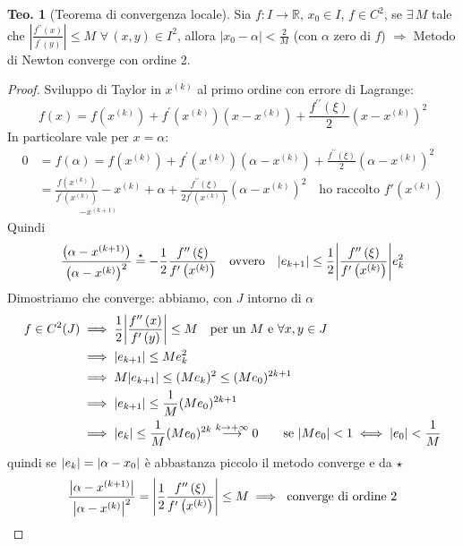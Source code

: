 \documentclass[a4paper,10pt]{article}
\theoremstyle{definition}
\theoremstyle{indentdefinition}
\theoremstyle{indenttheorem}
\newtheorem{thm}{Teo.}
\theoremstyle{myremark}
\theoremstyle{indentgeneral}
\theoremstyle{plain}
\theoremstyle{plain}
\newenvironment{myboxed} 
{\noindent\begin{lrbox}{\mybox}\begin{minipage}{\textwidth}}
{\end{minipage}\end{lrbox}\fbox{\usebox{\mybox}}}
\begin{document}
\begin{myboxed}
\begin{thm}[Teorema di convergenza locale]
Sia $f\colon I\rightarrow\mathbb{R}$, $x_{0}\in I$, $f\in C^{2}$,
se $\exists\,M$ tale che $\left|\frac{f^{\prime\prime}\left(x\right)}{f^{\prime}\left(y\right)}\right|\leq M$
$\forall\,\left(x,y\right)\in I^{2}$, allora $\left|x_{0}-\alpha\right|<\frac{2}{M}$
(con $\alpha$ zero di $f$) $\Longrightarrow$ Metodo di Newton converge
con ordine 2.
\end{thm}
\end{myboxed}

\begin{proof}
Sviluppo di Taylor in $x^{(k)}$ al primo ordine con errore di Lagrange:
$$f(x)=f(x^{(k)})+f^{\prime}(x^{(k)})(x-x^{\left(k\right)})+\frac{f^{\prime\prime}\left(\xi\right)}{2}\left(x-x^{\left(k\right)}\right)^{2}$$
In particolare vale per $x=\alpha$:
\begin{align*}
0&=f(\alpha)=f(x^{(k)})+f^{\prime}(x^{(k)})(\alpha-x^{\left(k\right)})+\frac{f^{\prime\prime}\left(\xi\right)}{2}\left(\alpha-x^{\left(k\right)}\right)^{2}  \\
&=\underset{-x^{\left(k+1\right)}}{\boxed{\frac{f\left(x^{\left(k\right)}\right)}{f^{\prime}\left(x^{\left(k\right)}\right)}-x^{\left(k\right)}}}+\alpha+\frac{f^{\prime\prime}\left(\xi\right)}{2f^{\prime}\left(x^{\left(k\right)}\right)}\left(\alpha-x^{\left(k\right)}\right)^{2} \quad \text{ho raccolto $f'(x^{(k)})$}
\end{align*}
Quindi
$$\frac{\left(\alpha-x^{\left(k+1\right)}\right)}{\left(\alpha-x^{\left(k\right)}\right)^{2}}\overset{\star}{=}-\frac{1}{2}\frac{f^{\prime\prime}\left(\xi\right)}{f^{\prime}\left(x^{\left(k\right)}\right)}\quad \text{ovvero} \quad \abs{e_{k+1}}\le \frac{1}{2}\abs{\frac{f^{\prime\prime}\left(\xi\right)}{f^{\prime}\left(x^{\left(k\right)}\right)}}e_k^2$$
Dimostriamo che converge: abbiamo, con $J$ intorno di $\alpha$
\begin{align*}
    f\in C^2(J)&\implies \frac{1}{2}\abs{\frac{f^{\prime\prime}\left(x\right)}{f^{\prime}\left(y\right)}}\le M \quad \text{per un $M$ e }\forall x,y\in J\\
    &\implies \abs{e_{k+1}}\le Me_k^2 \\
    &\implies  M\abs{e_{k+1}}\le (Me_k)^2\le (Me_0)^{2k+1}\\
    &\implies  \abs{e_{k+1}}\le\frac{1}{M}(Me_0)^{2k+1}\\
    &\implies  \abs{e_{k}}\le \frac{1}{M}(Me_0)^{2k}\overset{k\to+\infty}{\longrightarrow}0 \qquad \text{se } \abs{Me_0}<1\iff \abs{e_0}<\frac{1}{M}\\
\end{align*}
quindi se $\abs{e_{k}}=\abs{\alpha-x_0}$ è abbastanza piccolo il metodo converge e da $\star$
$$\frac{\abs{\alpha-x^{\left(k+1\right)}}}{\abs{\alpha-x^{\left(k\right)}}^{2}}=\abs{\frac{1}{2}\frac{f^{\prime\prime}\left(\xi\right)}{f^{\prime}\left(x^{\left(k\right)}\right)}}\le M\implies\text{ converge di ordine 2}$$
\end{proof}
\end{document}
